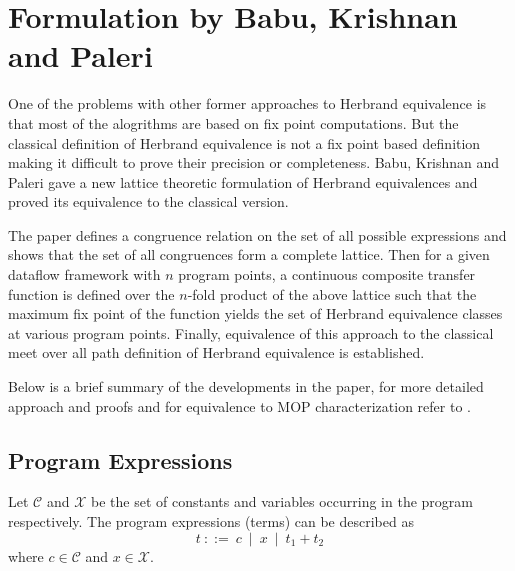 \chapter{Formulation by Babu, Krishnan and Paleri}
\label{chap:chapter3}

One of the problems with other former approaches to Herbrand 
equivalence is that most of the alogrithms are based on fix point 
computations. But the classical definition of Herbrand equivalence is 
not a fix point based definition making it difficult to prove their 
precision or completeness. Babu, Krishnan and Paleri \cite{Babu} gave 
a new lattice theoretic formulation of Herbrand equivalences and 
proved its equivalence to the classical version.

The paper defines a congruence relation on the set of all possible 
expressions and shows that the set of all congruences form a complete 
lattice. Then for a given dataflow framework with $n$ program points, 
a continuous composite transfer function is defined over the $n$-fold 
product of the above lattice such that the maximum fix point of the 
function yields the set of Herbrand equivalence classes at various 
program points. Finally, equivalence of this approach to the 
classical meet over all path definition of Herbrand equivalence is 
established.

Below is a brief summary of the developments in the paper, for more 
detailed approach and proofs and for equivalence to MOP characterization 
refer to \cite{Babu}.

\section{Program Expressions}
\label{sec:ProgramExpressions}

Let $\mathcal C$ and $\mathcal X$ be the set of constants and variables 
occurring in the program respectively. The program expressions (terms) 
can be described as 
$$t\ ::=\ c\ \mid\ x\ \mid\ t_1 + t_2$$
where $c \in \mathcal C$ and $x \in \mathcal X$.

